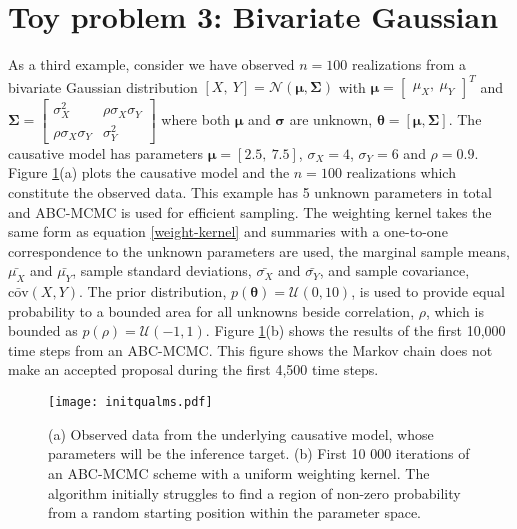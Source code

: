 \section{Toy problem 3: Bivariate Gaussian}
As a third example, consider we have observed $n = 100$ realizations from a bivariate Gaussian distribution $[X,\ Y] = \mathcal{N}(\bm{\mu},\bm{\Sigma})$ with $\bm{\mu} = \begin{bmatrix}
\mu_X,\ \mu_Y
\end{bmatrix}^T$ and $\bm{\Sigma} = \begin{bmatrix}
\sigma^2_X & \rho\sigma_X\sigma_Y\\
\rho\sigma_X\sigma_Y & \sigma^2_Y
\end{bmatrix} $ where both $\bm{\mu}$ and $\bm{\sigma}$ are unknown, $\bm{\theta} = [\bm{\mu},\bm{\Sigma}]$. The causative model has parameters $\bm{\mu} = [2.5,\ 7.5]$, $\sigma_X = 4$, $\sigma_Y = 6$ and $\rho = 0.9$. Figure \ref{init-qualms}(a) plots the causative model and the $n = 100$ realizations which constitute the observed data. This example has 5 unknown parameters in total and ABC-MCMC is used for efficient sampling. The weighting kernel takes the same form as equation \ref{weight-kernel} and summaries with a one-to-one correspondence to the unknown parameters are used, the marginal sample means, $\bar{\mu_X}$ and $\bar{\mu_Y}$, sample standard deviations, $\bar{\sigma_X}$ and $\bar{\sigma_Y}$, and sample covariance, $\bar{\text{cov}}(X,Y)$. The prior distribution, $p(\bm{\theta}) = \mathcal{U}(0,10)$, is used to provide equal probability to a bounded area for all unknowns beside correlation, $\rho$, which is bounded as $p(\rho) = \mathcal{U}(-1,1)$. Figure \ref{init-qualms}(b) shows the results of the first 10,000 time steps from an ABC-MCMC. This figure shows the Markov chain does not make an accepted proposal during the first 4,500 time steps.
\begin{figure}[H]
	\centering
	\texttt{[image: initqualms.pdf]}
	\caption{(a) Observed data from the underlying causative model, whose parameters will be the inference target. (b) First 10 000 iterations of an ABC-MCMC scheme with a uniform weighting kernel. The algorithm initially struggles to find a region of non-zero probability from a random starting position within the parameter space.}
	\label{init-qualms}
\end{figure}

